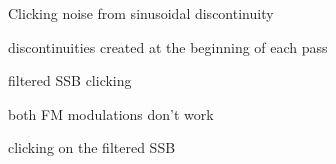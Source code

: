 
\begin{DoxyRefList}
\item[\label{bug__bug000001}%
\hypertarget{bug__bug000001}{}%
File \hyperlink{alsa__test_8cpp}{alsa\+\_\+test.cpp} ]Clicking noise from sinusoidal discontinuity  
\item[\label{bug__bug000002}%
\hypertarget{bug__bug000002}{}%
File \hyperlink{Filter_8hpp}{Filter.hpp} ]discontinuities created at the beginning of each pass  
\item[\label{bug__bug000005}%
\hypertarget{bug__bug000005}{}%
File \hyperlink{modulator__test_8cpp}{modulator\+\_\+test.cpp} ]filtered S\+S\+B clicking  
\item[\label{bug__bug000004}%
\hypertarget{bug__bug000004}{}%
Namespace \hyperlink{namespaceradio}{radio} ]both F\+M modulations don't work 

clicking on the filtered S\+S\+B 
\end{DoxyRefList}